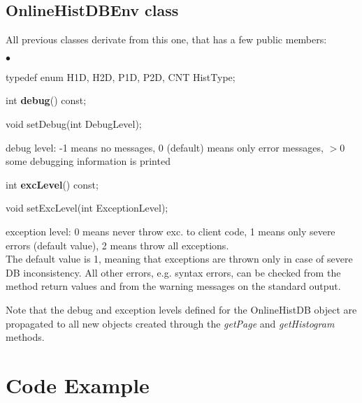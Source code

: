 \documentclass{lhcbnote}
\begin{document}
\subsection{OnlineHistDBEnv class}\label{dbenvclass}
All previous classes derivate from this one, that has a few public
members:
\begin{list}{$\bullet$}{}
\item typedef enum { H1D, H2D, P1D, P2D, CNT} HistType;
\item  int {\bf debug}() const;
\item void setDebug(int DebugLevel);

debug level: -1 means no messages, 0 (default) means only error
messages, $>$0 some debugging information is printed 

\item int {\bf excLevel}() const;
\item void setExcLevel(int ExceptionLevel);

exception level: 0 means never throw exc. to client code, 1 means only
severe errors (default value), 2 means throw all exceptions.\\
The default value is 1, meaning that exceptions are thrown only in
case of severe DB inconsistency. All other errors, e.g. syntax errors,
can be checked from the method return values and from the warning
messages on the standard output.
\end{list}

Note that the debug and exception levels defined for the OnlineHistDB object are
propagated to all new objects created through the {\it getPage} and
{\it getHistogram} methods.



\section{Code Example}
\end{document}
